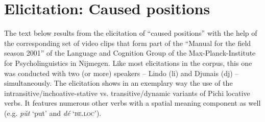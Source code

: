\section{Elicitation: Caused positions}

The text below results from the elicitation of “caused positions” with the help of the corresponding set of video clips that form part of the “Manual for the field season 2001” of the Language and Cognition Group of the Max-Planck-Institute for Psycholinguistics in Nijmegen. Like most elicitations in the corpus, this one was conducted with two (or more) speakers – Lindo (li) and Djunais (dj) – simultaneously. The elicitation shows in an exemplary way the use of the intransitive/inchoative-stative vs. transitive/dynamic variants of Pichi locative verbs. It features numerous other verbs with a spatial meaning component as well (e.g. \textit{pút} ‘put’ and \textit{dé} \textsc{‘be.loc’}).

\setcounter{equation}{0}  %

